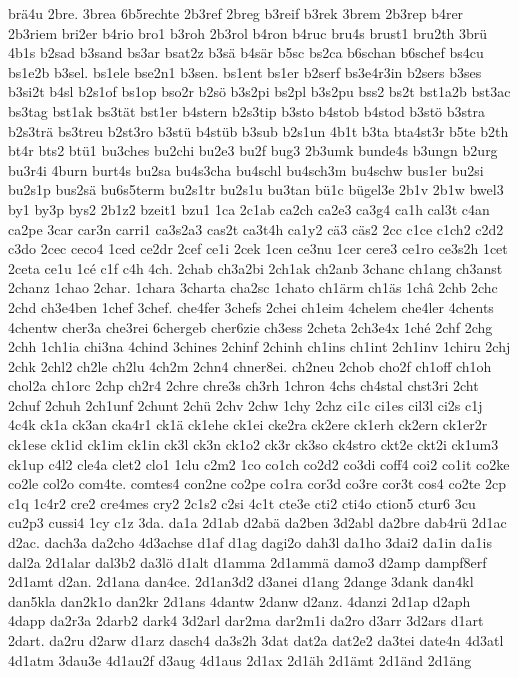 {brä4u
2bre.
3brea
6b5rechte
2b3ref
2breg
b3reif
b3rek
3brem
2b3rep
b4rer
2b3riem
bri2er
b4rio
bro1
b3roh
2b3rol
b4ron
b4ruc
bru4s
brust1
bru2th
3brü
4b1s
b2sad
b3sand
bs3ar
bsat2z
b3sä
b4sär
b5sc
bs2ca
b6schan
b6schef
bs4cu
bs1e2b
b3sel.
bs1ele
bse2n1
b3sen.
bs1ent
bs1er
b2serf
bs3e4r3in
b2sers
b3ses
b3si2t
b4sl
b2s1of
bs1op
bso2r
b2sö
b3s2pi
bs2pl
b3s2pu
bss2
bs2t
bst1a2b
bst3ac
bs3tag
bst1ak
bs3tät
bst1er
b4stern
b2s3tip
b3sto
b4stob
b4stod
b3stö
b3stra
b2s3trä
bs3treu
b2st3ro
b3stü
b4stüb
b3sub
b2s1un
4b1t
b3ta
bta4st3r
b5te
b2th
bt4r
bts2
btü1
bu3ches
bu2chi
bu2e3
bu2f
bug3
2b3umk
bunde4s
b3ungn
b2urg
bu3r4i
4burn
burt4s
bu2sa
bu4s3cha
bu4schl
bu4sch3m
bu4schw
bus1er
bu2si
bu2s1p
bus2sä
bu6s5term
bu2s1tr
bu2s1u
bu3tan
bü1c
bügel3e
2b1v
2b1w
bwel3
by1
by3p
bys2
2b1z2
bzeit1
bzu1
1ca
2c1ab
ca2ch
ca2e3
ca3g4
ca1h
cal3t
c4an
ca2pe
3car
car3n
carri1
ca3s2a3
cas2t
ca3t4h
ca1y2
cä3
cäs2
2cc
c1ce
c1ch2
c2d2
c3do
2cec
ceco4
1ced
ce2dr
2cef
ce1i
2cek
1cen
ce3nu
1cer
cere3
ce1ro
ce3s2h
1cet
2ceta
ce1u
1cé
c1f
c4h
4ch.
2chab
ch3a2bi
2ch1ak
ch2anb
3chanc
ch1ang
ch3anst
2chanz
1chao
2char.
1chara
3charta
cha2sc
1chato
ch1ärm
ch1äs
1châ
2chb
2chc
2chd
ch3e4ben
1chef
3chef.
che4fer
3chefs
2chei
ch1eim
4chelem
che4ler
4chents
4chentw
cher3a
che3rei
6chergeb
cher6zie
ch3ess
2cheta
2ch3e4x
1ché
2chf
2chg
2chh
1ch1ia
chi3na
4chind
3chines
2chinf
2chinh
ch1ins
ch1int
2ch1inv
1chiru
2chj
2chk
2chl2
ch2le
ch2lu
4ch2m
2chn4
chner8ei.
ch2neu
2chob
cho2f
ch1off
ch1oh
chol2a
ch1orc
2chp
ch2r4
2chre
chre3s
ch3rh
1chron
4chs
ch4stal
chst3ri
2cht
2chuf
2chuh
2ch1unf
2chunt
2chü
2chv
2chw
1chy
2chz
ci1c
ci1es
cil3l
ci2s
c1j
4c4k
ck1a
ck3an
cka4r1
ck1ä
ck1ehe
ck1ei
cke2ra
ck2ere
ck1erh
ck2ern
ck1er2r
ck1ese
ck1id
ck1im
ck1in
ck3l
ck3n
ck1o2
ck3r
ck3so
ck4stro
ckt2e
ckt2i
ck1um3
ck1up
c4l2
cle4a
clet2
clo1
1clu
c2m2
1co
co1ch
co2d2
co3di
coff4
coi2
co1it
co2ke
co2le
col2o
com4te.
comtes4
con2ne
co2pe
co1ra
cor3d
co3re
cor3t
cos4
co2te
2cp
c1q
1c4r2
cre2
cre4mes
cry2
2c1s2
c2si
4c1t
cte3e
cti2
cti4o
ction5
ctur6
3cu
cu2p3
cussi4
1cy
c1z
3da.
da1a
2d1ab
d2abä
da2ben
3d2abl
da2bre
dab4rü
2d1ac
d2ac.
dach3a
da2cho
4d3achse
d1af
d1ag
dagi2o
dah3l
da1ho
3dai2
da1in
da1is
dal2a
2d1alar
dal3b2
da3lö
d1alt
d1amma
2d1ammä
damo3
d2amp
dampf8erf
2d1amt
d2an.
2d1ana
dan4ce.
2d1an3d2
d3anei
d1ang
2dange
3dank
dan4kl
dan5kla
dan2k1o
dan2kr
2d1ans
4dantw
2danw
d2anz.
4danzi
2d1ap
d2aph
4dapp
da2r3a
2darb2
dark4
3d2arl
dar2ma
dar2m1i
da2ro
d3arr
3d2ars
d1art
2dart.
da2ru
d2arw
d1arz
dasch4
da3s2h
3dat
dat2a
dat2e2
da3tei
date4n
4d3atl
4d1atm
3dau3e
4d1au2f
d3aug
4d1aus
2d1ax
2d1äh
2d1ämt
2d1änd
2d1äng
}
